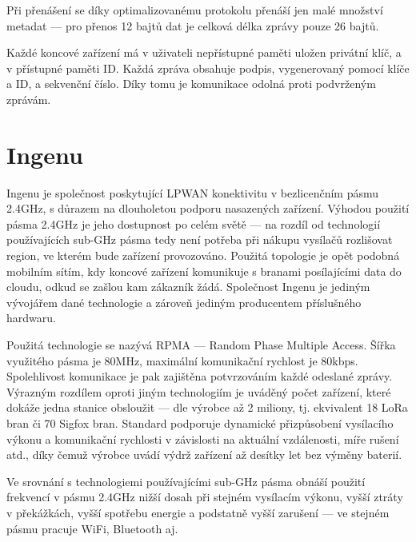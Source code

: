 Při přenášení se díky optimalizovanému protokolu přenáší jen malé množství 
metadat --- pro přenos 12 bajtů dat je celková délka zprávy pouze 26 bajtů.

Každé koncové zařízení má v uživateli nepřístupné paměti uložen privátní klíč, a 
v přístupné paměti ID. Každá zpráva obsahuje podpis, vygenerovaný pomocí klíče a 
ID, a sekvenční číslo. Díky tomu je komunikace odolná proti podvrženým zprávám.

\section{Ingenu}

Ingenu je společnost poskytující LPWAN konektivitu v bezlicenčním pásmu 2.4GHz, s důrazem na dlouholetou podporu nasazených zařízení. Výhodou 
použití pásma 2.4GHz je jeho dostupnost po celém světě --- na rozdíl od 
technologií používajících sub-GHz pásma tedy není potřeba při nákupu vysílačů 
rozlišovat
region, ve kterém bude zařízení provozováno. Použitá topologie je opět podobná mobilním 
sítím, kdy koncové zařízení komunikuje s branami posílajícími data do cloudu,
odkud se zašlou kam zákazník žádá. Společnost Ingenu je jediným vývojářem 
dané technologie a zároveň jediným producentem příslušného hardwaru.

Použitá technologie se nazývá RPMA --- Random Phase Multiple Access. Šířka 
využitého pásma je 80MHz, maximální komunikační rychlost je 80kbps. Spolehlivost
komunikace je pak zajištěna potvrzováním každé odeslané zprávy. Výrazným 
rozdílem oproti jiným technologiím je uváděný počet zařízení, které dokáže jedna 
stanice obsloužit --- dle výrobce až 2 miliony, tj. ekvivalent 18 LoRa bran či 
70 Sigfox bran. Standard podporuje dynamické přizpůsobení vysílacího výkonu a 
komunikační rychlosti v závislosti na aktuální vzdálenosti, míře rušení atd., 
díky čemuž výrobce uvádí výdrž zařízení až desítky let bez výměny baterií.

Ve srovnání s technologiemi používajícími sub-GHz pásma obnáší použití frekvencí 
v pásmu 2.4GHz nižší dosah při stejném vysílacím výkonu, vyšší ztráty v 
překážkách, vyšší spotřebu energie a podstatně vyšší zarušení --- ve stejném 
pásmu pracuje WiFi, Bluetooth aj.

